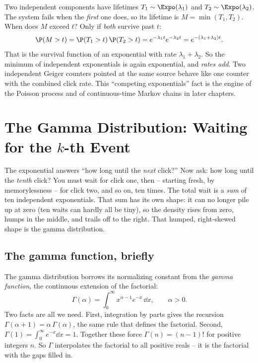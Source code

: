 \begin{example}
\label{ch11:ex-min}
Two independent components have lifetimes $T_1 \sim \Expo(\lambda_1)$ and
$T_2 \sim \Expo(\lambda_2)$. The system fails when the \emph{first} one does, so
its lifetime is $M = \min(T_1,T_2)$. When does $M$ exceed $t$? Only if
\emph{both} survive past $t$:
\[
  \P(M > t) = \P(T_1 > t)\,\P(T_2 > t) = e^{-\lambda_1 t}e^{-\lambda_2 t}
            = e^{-(\lambda_1+\lambda_2)t}.
\]
That is the survival function of an exponential with rate
$\lambda_1 + \lambda_2$. So the minimum of independent exponentials is again
exponential, and \emph{rates add}. Two independent Geiger counters pointed at the
same source behave like one counter with the combined click rate. This
``competing exponentials'' fact is the engine of the Poisson process and of
continuous-time Markov chains in later chapters.
\end{example}

\section{The Gamma Distribution: Waiting for the $k$-th Event}
\label{ch11:gamma}

\begin{intuitionbox}
The exponential answers ``how long until the \emph{next} click?'' Now ask: how
long until the \emph{tenth} click? You must wait for click one, then -- starting
fresh, by memorylessness -- for click two, and so on, ten times. The total wait
is a \emph{sum} of ten independent exponentials. That sum has its own shape: it
can no longer pile up at zero (ten waits can hardly all be tiny), so the density
rises from zero, humps in the middle, and trails off to the right. That humped,
right-skewed shape is the gamma distribution.
\end{intuitionbox}

\subsection{The gamma function, briefly}

The gamma distribution borrows its normalizing constant from the \emph{gamma
function}, the continuous extension of the factorial:
\[
  \Gamma(\alpha) = \int_0^\infty x^{\alpha-1} e^{-x}\,\dd x, \qquad \alpha > 0.
\]
Two facts are all we need. First, integration by parts gives the recursion
$\Gamma(\alpha+1) = \alpha\,\Gamma(\alpha)$, the same rule that defines the
factorial. Second, $\Gamma(1) = \int_0^\infty e^{-x}\dd x = 1$. Together these
force $\Gamma(n) = (n-1)!$ for positive integers $n$. So $\Gamma$ interpolates
the factorial to all positive reals -- it is the factorial with the gaps filled
in.


